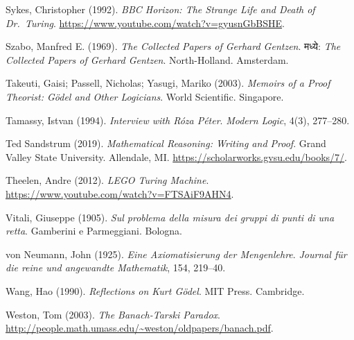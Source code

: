 \par\medskip{}\label{bib:Sykes1992}
Sykes, Christopher (1992). \emph{{BBC} {H}orizon: The Strange Life and Death of {D}r.~{T}uring}. \url{https://www.youtube.com/watch?v=gyusnGbBSHE}.

\par\medskip{}\label{bib:Gentzen1969}
Szabo, Manfred E. (1969). \emph{The Collected Papers of {G}erhard {G}entzen}. मध्ये: \emph{The Collected Papers of {G}erhard {G}entzen}. North-Holland. Amsterdam.

\par\medskip{}\label{bib:Takeuti2003}
Takeuti, Gaisi; Passell, Nicholas; Yasugi, Mariko (2003). \emph{Memoirs of a Proof Theorist: G\"odel and Other Logicians}. World Scientific. Singapore.

\par\medskip{}\label{bib:Tamassy1994}
Tamassy, Istvan (1994). \emph{Interview with {R}\'oza {P}\'eter}. \emph{Modern Logic}, 4(3), 277--280.

\par\medskip{}\label{bib:Sandstrum2019}
Ted Sandstrum (2019). \emph{Mathematical Reasoning: Writing and Proof}. Grand Valley State University. Allendale, MI. \url{https://scholarworks.gvsu.edu/books/7/}.

\par\medskip{}\label{bib:Theelen2012}
Theelen, Andre (2012). \emph{LEGO Turing Machine}. \url{https://www.youtube.com/watch?v=FTSAiF9AHN4}.

\par\medskip{}\label{bib:Vitali1905}
Vitali, Giuseppe (1905). \emph{Sul problema della misura dei gruppi di punti di una retta}. Gamberini e Parmeggiani. Bologna.

\par\medskip{}\label{bib:VonNeumann1925}
von Neumann, John (1925). \emph{Eine {Axiomatisierung} der {Mengenlehre}}. \emph{Journal f\"{u}r die reine und angewandte {Mathematik}}, 154, 219--40.

\par\medskip{}\label{bib:Wang1990}
Wang, Hao (1990). \emph{Reflections on Kurt G{\"{o}}del}. MIT Press. Cambridge.

\par\medskip{}\label{bib:Weston2003}
Weston, Tom (2003). \emph{The {Banach}-{Tarski} Paradox}. \url{http://people.math.umass.edu/~weston/oldpapers/banach.pdf}.

